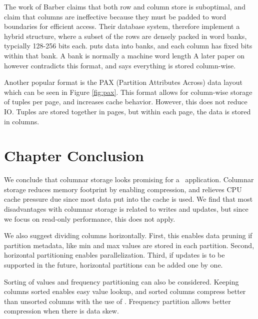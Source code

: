 The work of Barber \ea \cite{Barber2012-xt} claims that both row and column store is suboptimal, and claim that columns are ineffective because they must be padded to word boundaries for efficient access. Their database system,  therefore implement a hybrid structure, where a subset of the rows are densely packed in word banks, typcially 128-256 bits each.  puts data into banks, and each column has fixed bits within that bank. A bank is normally a machine word length \cite{Johnson2008-cp} A later paper on  \cite{Raman2013-em} however contradicts this format, and says everything is stored column-wise.

Another popular format is the PAX (Partition Attributes Across) data layout \cite{Holloway2008-rr, Bjorklund2011-wh} which can be seen in Figure \ref{fig:pax}. This format allows for column-wise storage of tuples per page, and increases cache behavior. However, this does not reduce IO. Tuples are stored together in pages, but within each page, the data is stored in columns.

\section{Chapter Conclusion}
\label{sec:Chapter Conclusion}
We conclude that columnar storage looks promising for a \bd~application. Columnar storage reduces memory footprint by enabling compression, and relieves CPU cache pressure due since most data put into the cache is used. We find that most disadvantages with columnar storage is related to writes and updates, but since we focus on read-only performance, this does not apply. 

We also suggest dividing columns horizontally. First, this enables data pruning if partition metadata, like min and max values are stored in each partition. Second, horizontal partitioning enables parallelization. Third, if updates is to be supported in the future, horizontal partitions can be added one by one.

Sorting of values and frequency partitioning can also be considered. Keeping columns sorted enables easy value lookup, and sorted columns compress better than unsorted columns with the use of \rle. Frequency partition allows better compression when there is data skew.
